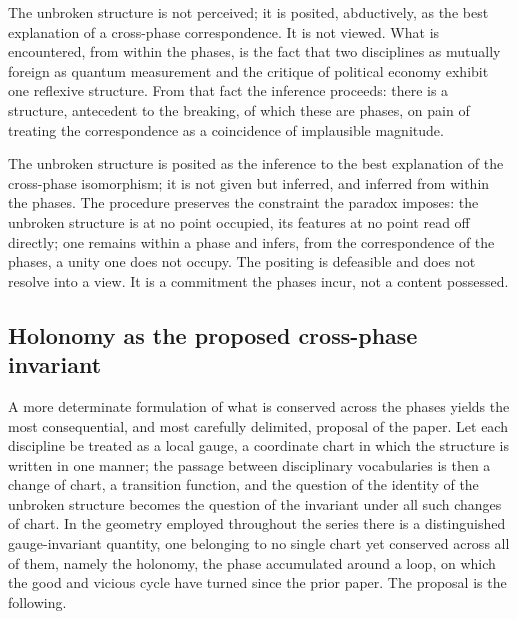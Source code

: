 The unbroken structure is not perceived; it is posited, abductively, as the best explanation of a cross-phase correspondence. It is not viewed. What is encountered, from within the phases, is the fact that two disciplines as mutually foreign as quantum measurement and the critique of political economy exhibit one reflexive structure. From that fact the inference proceeds: there is a structure, antecedent to the breaking, of which these are phases, on pain of treating the correspondence as a coincidence of implausible magnitude.

\begin{claim}
The unbroken structure is posited as the inference to the best explanation of the cross-phase isomorphism; it is not given but inferred, and inferred from within the phases. The procedure preserves the constraint the paradox imposes: the unbroken structure is at no point occupied, its features at no point read off directly; one remains within a phase and infers, from the correspondence of the phases, a unity one does not occupy. The positing is defeasible and does not resolve into a view. It is a commitment the phases incur, not a content possessed.
\end{claim}

\subsection{Holonomy as the proposed cross-phase invariant}
\label{p10:sec:invariant}

A more determinate formulation of what is conserved across the phases yields the most consequential, and most carefully delimited, proposal of the paper. Let each discipline be treated as a local gauge, a coordinate chart in which the structure is written in one manner; the passage between disciplinary vocabularies is then a change of chart, a transition function, and the question of the identity of the unbroken structure becomes the question of the invariant under all such changes of chart. In the geometry employed throughout the series there is a distinguished gauge-invariant quantity, one belonging to no single chart yet conserved across all of them, namely the holonomy, the phase accumulated around a loop, on which the good and vicious cycle have turned since the prior paper. The proposal is the following.

